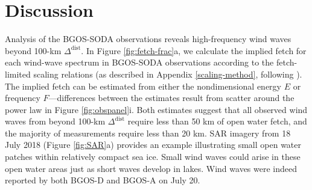 \documentclass [11pt, proquest] {uwthesis}[2020/02/24]
\begin{document}

\chapter{Discussion} \label{discussion}

Analysis of the BGOS-SODA observations reveals high-frequency wind waves beyond 100-km $\Delta^{\mathrm{dist}}$. In Figure \ref{fig:fetch-frac}a, we calculate the implied fetch for each wind-wave spectrum in BGOS-SODA observations according to the fetch-limited scaling relations (as described in Appendix \ref{scaling-method}, following \cite{Young1999}). The implied fetch can be estimated from either the nondimensional energy $E$ or frequency $F$---differences between the estimates result from scatter around the power law in Figure \ref{fig:obspanel}i. Both estimates suggest that all observed wind waves from beyond 100-km $\Delta^{\mathrm{dist}}$ require less than 50 km of open water fetch, and the majority of measurements require less than 20 km. SAR imagery from 18 July 2018 (Figure \ref{fig:SAR}a) provides an example illustrating small open water patches within relatively compact sea ice. Small wind waves could arise in these open water areas just as short waves develop in lakes. Wind waves were indeed reported by both BGOS-D and BGOS-A on July 20.  
\end{document}
